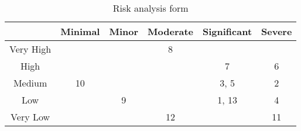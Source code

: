 \begin{table}[H]
    \centering
        \begin{tabular}{| c | c | c | c | c | c |} 
            \hline
            \cellcolor[HTML]{AFAFAF} & Minimal & Minor & 
                                       Moderate & Significant & 
                                       Severe    \\  
            \hline\hline
            Very High  &    \cellcolor[HTML]{FFEA00} & \cellcolor[HTML]{FFEA00} & 
                            \cellcolor[HTML]{FF0004} 8 & \cellcolor[HTML]{FF0004} &
                            \cellcolor[HTML]{FF0004}  \\ 
            \hline
            High       &    \cellcolor[HTML]{FFEA00} & \cellcolor[HTML]{FFEA00} & 
                            \cellcolor[HTML]{FFEA00} & \cellcolor[HTML]{FF0004} 7 & 
                            \cellcolor[HTML]{FF0004} 6 \\
            \hline
            Medium     &    \cellcolor[HTML]{00FF1D} 10& \cellcolor[HTML]{FFEA00} & 
                            \cellcolor[HTML]{FFEA00} & \cellcolor[HTML]{FFEA00} 3, 5 &
                            \cellcolor[HTML]{FF0004} 2 \\
            \hline
            Low        &    \cellcolor[HTML]{00FF1D} & \cellcolor[HTML]{00FF1D} 9 & 
                            \cellcolor[HTML]{FFEA00} & \cellcolor[HTML]{FFEA00} 1, 13 & 
                            \cellcolor[HTML]{FFEA00} 4 \\
            \hline
            Very Low   &    \cellcolor[HTML]{00FF1D} & \cellcolor[HTML]{00FF1D} & 
                            \cellcolor[HTML]{00FF1D} 12 & \cellcolor[HTML]{FFEA00} & 
                            \cellcolor[HTML]{FFEA00} 11 \\ [1ex]
            \hline
        \end{tabular}
    \caption{Risk analysis form}
    \label{riskForm}
\end{table}